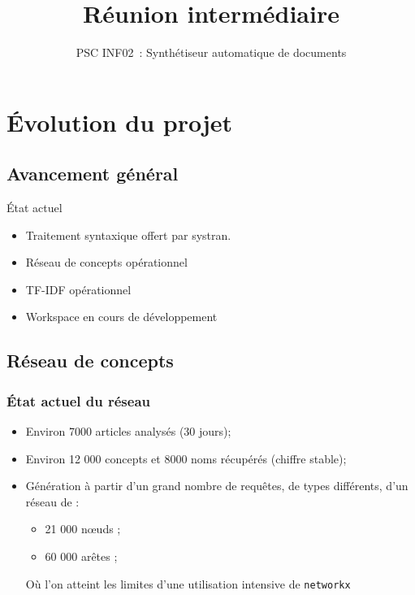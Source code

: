 \documentclass{beamer}
\title{Réunion intermédiaire}
\subtitle{PSC INF02~: Synthétiseur automatique de documents}
\author{}
\institute{École polytechnique}
\date{}
\begin{document}
\beamertemplatenavigationsymbolsempty{}
\begin{frame}
  \titlepage{}
\end{frame}

\section{Évolution du projet}
\subsection{Avancement général}

\begin{frame}
  \begin{block}{État actuel}
    \begin{itemize}
      \item Traitement syntaxique offert par systran.
      \item Réseau de concepts opérationnel
      \item TF-IDF opérationnel
      \item Workspace en cours de développement
    \end{itemize}
  \end{block}
\end{frame}

\subsection{Réseau de concepts}
\begin{frame}
\frametitle{État actuel du réseau}

\begin{itemize}
 \item Environ 7000 articles analysés (30 jours);
 \item Environ 12 000 concepts et 8000 noms récupérés (chiffre stable);
 \item Génération à partir d'un grand nombre de requêtes, de types différents, d'un réseau de :
 \begin{itemize}
  \item 21 000 n\oe uds ;
  \item 60 000 arêtes ;
 \end{itemize}
 \pause
 Où l'on atteint les limites d'une utilisation intensive de \texttt{networkx}
 
\end{itemize}

\end{frame}
\end{document}
